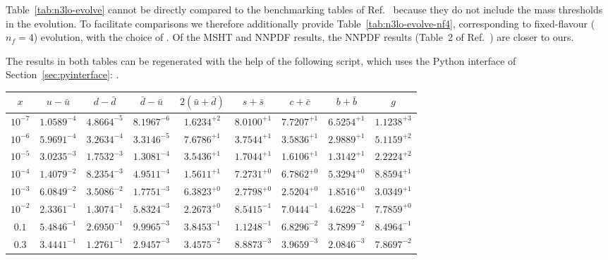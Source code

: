 Table~\ref{tab:n3lo-evolve} cannot be directly compared to the
benchmarking tables of Ref.~\cite{Cooper-Sarkar:2024crx} because they
do not include the mass thresholds in the \ntlo evolution.
%
To facilitate comparisons we therefore additionally provide
Table~\ref{tab:n3lo-evolve-nf4}, corresponding to fixed-flavour ($n_f=4$)
evolution, with the choice of
.
%
Of the MSHT and NNPDF results, the NNPDF results (Table~2 of
Ref.~\cite{Cooper-Sarkar:2024crx}) are closer to ours.

The results in both tables can be regenerated with the help
of the following script, which uses the Python interface of
Section~\ref{sec:pyinterface}:
.

\begin{table}[p]
  \small \centering
  \begin{tabular}{c|cccccccc}
    $x$ &  $u-\bar u$ &$d-\bar d$ &$\bar d-\bar u$ &  $ 2(\bar u+\bar d)$  &$s+\bar s$&$c+\bar c$ &$b+\bar b$  &   $g$\\
    \toprule
$10^{-7}$ &  $1.0589^{-4}$ &  $4.8664^{-5}$ &  $8.1967^{-6}$ &  $1.6234^{+2}$ &  $8.0100^{+1}$ &  $7.7207^{+1}$ &  $6.5254^{+1}$ &  $1.1238^{+3}$ \\
$10^{-6}$ &  $5.9691^{-4}$ &  $3.2634^{-4}$ &  $3.3146^{-5}$ &  $7.6786^{+1}$ &  $3.7544^{+1}$ &  $3.5836^{+1}$ &  $2.9889^{+1}$ &  $5.1159^{+2}$ \\
$10^{-5}$ &  $3.0235^{-3}$ &  $1.7532^{-3}$ &  $1.3081^{-4}$ &  $3.5436^{+1}$ &  $1.7044^{+1}$ &  $1.6106^{+1}$ &  $1.3142^{+1}$ &  $2.2224^{+2}$ \\
$10^{-4}$ &  $1.4079^{-2}$ &  $8.2354^{-3}$ &  $4.9511^{-4}$ &  $1.5611^{+1}$ &  $7.2731^{+0}$ &  $6.7862^{+0}$ &  $5.3294^{+0}$ &  $8.8594^{+1}$ \\
$10^{-3}$ &  $6.0849^{-2}$ &  $3.5086^{-2}$ &  $1.7751^{-3}$ &  $6.3823^{+0}$ &  $2.7798^{+0}$ &  $2.5204^{+0}$ &  $1.8516^{+0}$ &  $3.0349^{+1}$ \\
$10^{-2}$ &  $2.3361^{-1}$ &  $1.3074^{-1}$ &  $5.8324^{-3}$ &  $2.2673^{+0}$ &  $8.5415^{-1}$ &  $7.0444^{-1}$ &  $4.6228^{-1}$ &  $7.7859^{+0}$ \\
$0.1$    &  $5.4846^{-1}$ &  $2.6950^{-1}$ &  $9.9965^{-3}$ &  $3.8453^{-1}$ &  $1.1248^{-1}$ &  $6.8296^{-2}$ &  $3.7899^{-2}$ &  $8.4964^{-1}$ \\
$0.3$    &  $3.4441^{-1}$ &  $1.2761^{-1}$ &  $2.9457^{-3}$ &  $3.4575^{-2}$ &  $8.8873^{-3}$ &  $3.9659^{-3}$ &  $2.0846^{-3}$ &  $7.8697^{-2}$ \\

\end{tabular}
\end{table}
